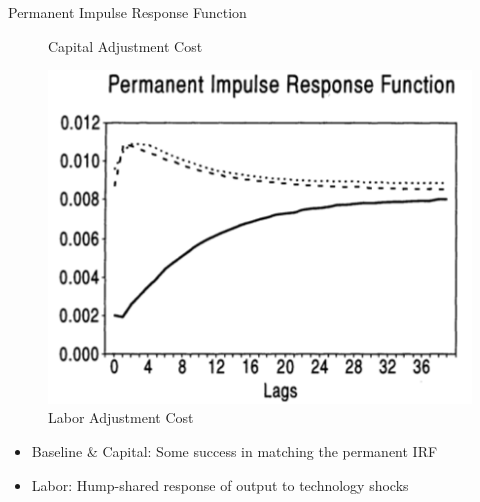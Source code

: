 \documentclass[10pt]{beamer}
\begin{document}
\begin{frame}{Permanent Impulse Response Function}
\begin{minipage}{0.33\textwidth}
\begin{figure}
            \caption{Capital Adjustment Cost}
        \end{figure}
    \end{minipage}%
    \begin{minipage}{0.33\textwidth}
        \begin{figure}
            \centering
            \includegraphics[width=\linewidth]{figures/L_per_IRF.png}
            \caption{Labor Adjustment Cost}
        \end{figure}
    \end{minipage}

    \begin{itemize}
        \item Baseline \& Capital: Some success in matching the permanent IRF
        \item Labor: Hump-shared response of output to technology shocks
    \end{itemize}

\end{frame}
\end{document}
